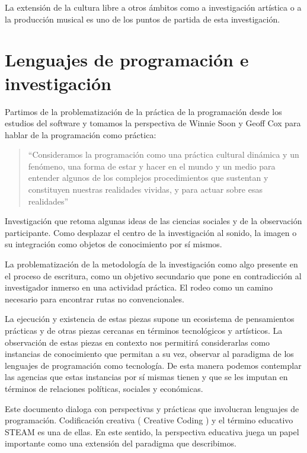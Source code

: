 
La extensión de la cultura libre a otros ámbitos como a investigación artística o a la producción musical es uno de los puntos de partida de esta investigación. 

\section{Lenguajes de programación e investigación} %

Partimos de la problematización de la práctica de la programación desde los estudios del software y tomamos la perspectiva de Winnie Soon y Geoff Cox para hablar de la programación como práctica:

\begin{quote}

``Consideramos la programación como una práctica cultural dinámica y un fenómeno, una forma de estar y hacer en el mundo y un medio para entender algunos de los complejos procedimientos que sustentan y constituyen nuestras realidades vividas, y para actuar sobre esas realidades'' \citep[p.~14]{aestheticProgramming}
  
\end{quote}

Investigación que retoma algunas ideas de las ciencias sociales y de la observación participante. Como desplazar el centro de la investigación al sonido, la imagen o su integración como objetos de conocimiento por sí mismos.

La problematización de la metodología de la investigación como algo presente en el proceso de escritura, como un objetivo secundario que pone en contradicción al investigador inmerso en una actividad práctica. El rodeo como un camino necesario para encontrar rutas no convencionales.

La ejecución y existencia de estas piezas supone un ecosistema de pensamientos prácticas y de otras piezas cercanas en términos tecnológicos y artísticos. La observación de estas piezas en contexto nos permitirá considerarlas como instancias de conocimiento que permitan a su vez, observar al paradigma de los lenguajes de programación como tecnología. De esta manera podemos contemplar las agencias que estas instancias por sí mismas tienen y que se les imputan en términos de relaciones políticas, sociales y económicas.

Este documento dialoga con perspectivas y prácticas que involucran lenguajes de programación. Codificación creativa ( Creative Coding ) y el término educativo \gls{STEAM} es una de ellas. En este sentido, la perspectiva educativa juega un papel importante como una extensión del paradigma que describimos.


